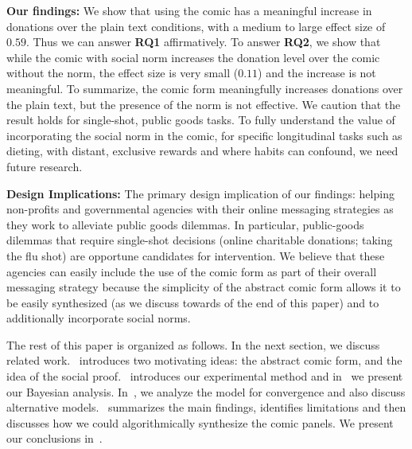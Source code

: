 \textbf{Our findings:} We show that using the comic has a meaningful increase in donations over the plain text conditions, with a medium to large effect size of $0.59$. Thus we can answer \textbf{RQ1} affirmatively. To answer \textbf{RQ2}, we show that while the comic with social norm increases the donation level over the comic without the norm, the effect size is very small ($0.11$) and the increase is not meaningful. To summarize, the comic form meaningfully increases donations over the plain text, but the presence of the norm is not effective. We caution that the result holds for single-shot, public goods tasks. To fully understand the value of incorporating the social norm in the comic, for specific longitudinal tasks such as dieting, with distant, exclusive rewards and where habits can confound, we need future research.  

\textbf{Design Implications:} The primary design implication of our findings: helping non-profits and governmental agencies with their online messaging strategies as they work to alleviate public goods dilemmas. In particular, public-goods dilemmas that require single-shot decisions (online charitable donations; taking the flu shot) are opportune candidates for intervention. We believe that these agencies can easily include the use of the comic form as part of their overall messaging strategy because the simplicity of the abstract comic form allows it to be easily synthesized (as we discuss towards of the end of this paper) and to additionally incorporate social norms. 


The rest of this paper is organized as follows. In the next section, we discuss related work.~ introduces two motivating ideas: the abstract comic form, and the idea of the social proof.~ introduces our experimental method and in~ we present our Bayesian analysis. In~, we analyze the model for convergence and also discuss alternative models.~ summarizes the main findings, identifies limitations and then discusses how we could algorithmically synthesize the comic panels. We present our conclusions in~. 
